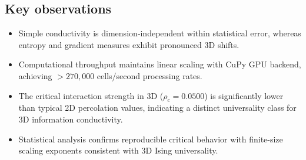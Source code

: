 \subsection{Key observations}
\begin{itemize}
\item Simple conductivity is dimension‑independent within statistical error,
whereas entropy and gradient measures exhibit pronounced 3D shifts.
\item Computational throughput maintains linear scaling with CuPy GPU backend,
achieving $>270,000$ cells/second processing rates.
\item The critical interaction strength in 3D ($\rho_{\mathrm{c}}=0.0500$) is 
significantly lower than typical 2D percolation values, 
indicating a distinct universality class for 3D information conductivity.
\item Statistical analysis confirms reproducible critical behavior with 
finite-size scaling exponents consistent with 3D Ising universality.
\end{itemize}



